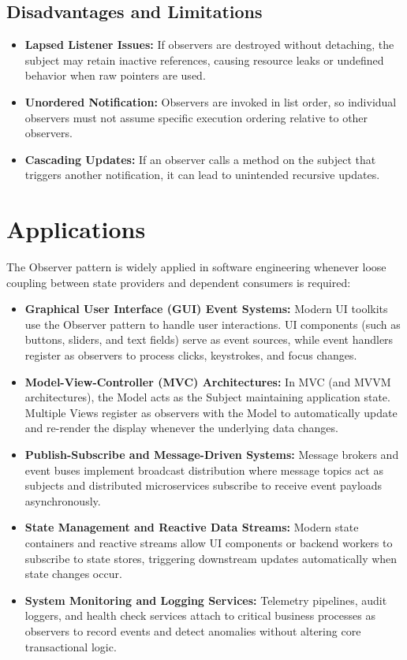 \documentclass[12pt,a4paper]{article}
\begin{document}
\subsection{Disadvantages and Limitations}
\begin{itemize}
    \item \textbf{Lapsed Listener Issues:} If observers are destroyed without detaching, the subject may retain inactive references, causing resource leaks or undefined behavior when raw pointers are used.
    \item \textbf{Unordered Notification:} Observers are invoked in list order, so individual observers must not assume specific execution ordering relative to other observers.
    \item \textbf{Cascading Updates:} If an observer calls a method on the subject that triggers another notification, it can lead to unintended recursive updates.
\end{itemize}

\section{Applications}

The Observer pattern is widely applied in software engineering whenever loose coupling between state providers and dependent consumers is required:

\begin{itemize}
    \item \textbf{Graphical User Interface (GUI) Event Systems:} Modern UI toolkits use the Observer pattern to handle user interactions. UI components (such as buttons, sliders, and text fields) serve as event sources, while event handlers register as observers to process clicks, keystrokes, and focus changes.
    \item \textbf{Model-View-Controller (MVC) Architectures:} In MVC (and MVVM architectures), the Model acts as the Subject maintaining application state. Multiple Views register as observers with the Model to automatically update and re-render the display whenever the underlying data changes.
    \item \textbf{Publish-Subscribe and Message-Driven Systems:} Message brokers and event buses implement broadcast distribution where message topics act as subjects and distributed microservices subscribe to receive event payloads asynchronously.
    \item \textbf{State Management and Reactive Data Streams:} Modern state containers and reactive streams allow UI components or backend workers to subscribe to state stores, triggering downstream updates automatically when state changes occur.
    \item \textbf{System Monitoring and Logging Services:} Telemetry pipelines, audit loggers, and health check services attach to critical business processes as observers to record events and detect anomalies without altering core transactional logic.
\end{itemize}
\end{document}
